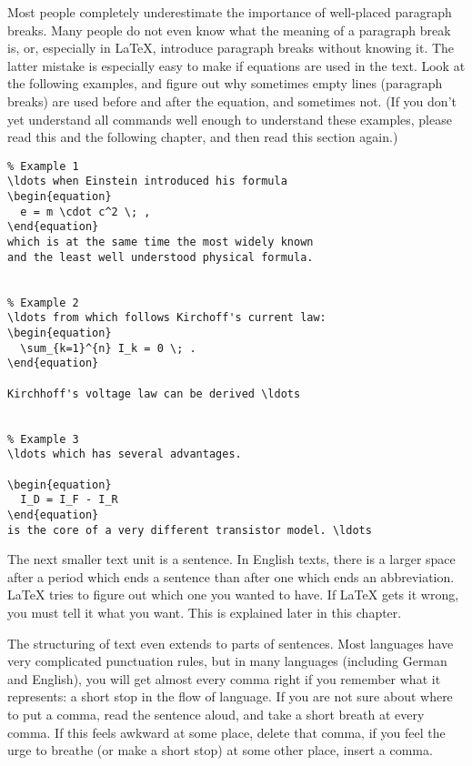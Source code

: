 Most people completely underestimate the importance of well-placed
paragraph breaks.  Many people do not even know what the meaning of
a paragraph break is, or, especially in \LaTeX, introduce paragraph
breaks without knowing it.  The latter mistake is especially easy to
make if equations are used in the text.  Look at the following
examples, and figure out why sometimes empty lines (paragraph breaks)
are used before and after the equation, and sometimes not.  (If you
don't yet understand all commands well enough to understand these
examples, please read this and the following chapter, and then read
this section again.)

\begin{code}
\begin{verbatim}
% Example 1
\ldots when Einstein introduced his formula 
\begin{equation} 
  e = m \cdot c^2 \; , 
\end{equation} 
which is at the same time the most widely known 
and the least well understood physical formula. 


% Example 2
\ldots from which follows Kirchoff's current law:
\begin{equation} 
  \sum_{k=1}^{n} I_k = 0 \; .
\end{equation} 

Kirchhoff's voltage law can be derived \ldots


% Example 3
\ldots which has several advantages.

\begin{equation} 
  I_D = I_F - I_R
\end{equation} 
is the core of a very different transistor model. \ldots
\end{verbatim}
\end{code} 

The next smaller text unit is a sentence.  In English texts, there is
a larger space after a period which ends a sentence than after one
which ends an abbreviation.  \LaTeX{} tries to figure out which one
you wanted to have.  If \LaTeX{} gets it wrong, you must tell it what
you want.  This is explained later in this chapter.

The structuring of text even extends to parts of sentences.  Most
languages have very complicated punctuation rules, but in many
languages (including German and English), you will get almost every
comma right if you remember what it represents: a short stop in the
flow of language.  If you are not sure about where to put a comma,
read the sentence aloud, and take a short breath at every comma.  If
this feels awkward at some place, delete that comma, if you feel the
urge to breathe (or make a short stop) at some other place, insert a
comma.

